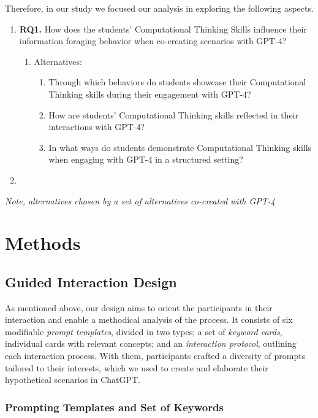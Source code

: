 \documentclass[sn-mathphys, Numbered]{sn-jnl}%
\theoremstyle{thmstyleone}%
\theoremstyle{thmstyletwo}%
\theoremstyle{thmstylethree}%
\begin{document}
Therefore, in our study we focused our analysis in exploring the following aspects.
\begin{enumerate}
    \item[] \textbf{RQ1.} How does the students' Computational Thinking Skills influence their information foraging behavior when co-creating scenarios with GPT-4?
    \begin{enumerate}
        \item[] Alternatives:
        \begin{enumerate}
            \item  Through which behaviors do students showcase their Computational Thinking skills during their engagement with GPT-4?
            \item How are students' Computational Thinking skills reflected in their interactions with GPT-4? 
            \item In what ways do students demonstrate Computational Thinking skills when engaging with GPT-4 in a structured setting?
        \end{enumerate}
    \end{enumerate}
    \item  [] %
\end{enumerate}
\textit{Note, alternatives chosen by a set of alternatives co-created with GPT-4 }


\section{Methods}\label{Methods}


\subsection*{Guided Interaction Design}\label{Interaction design}

As mentioned above, our design aims to orient the participants in their interaction and enable a methodical analysis of the process. It consists of six modifiable \textit{prompt templates}, divided in two types; a set of \textit{keyword cards}, individual cards with relevant concepts; and an \textit{interaction protocol}, outlining each interaction process. With them, participants crafted a diversity of prompts tailored to their interests, which we used to create and elaborate their hypothetical scenarios in ChatGPT. 

\subsubsection*{Prompting Templates and Set of Keywords}
\end{document}
